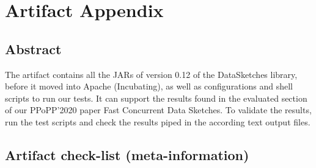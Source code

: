 
\section{Artifact Appendix}

\subsection{Abstract}

The artifact contains all the JARs of version 0.12 of the DataSketches
library, before it moved into Apache (Incubating), as well as configurations
and shell scripts to run our tests. It can support the results found in
the evaluated section of our PPoPP'2020 paper Fast Concurrent Data Sketches. To
validate the results, run the test scripts and check the results piped
in the according text output files.

\subsection{Artifact check-list (meta-information)}

